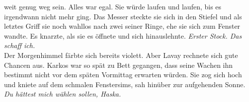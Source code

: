 weit genug weg sein. Alles war egal. Sie würde laufen und laufen, bis es irgendwann nicht mehr ging. 
Das Messer steckte sie sich in den Stiefel und als letztes Griff sie noch wahllos nach zwei seiner 
Ringe, ehe sie sich zum Fenster wandte. Es knarzte, als sie es öffnete und sich hinauslehnte. 
\textit{Erster Stock. Das schaff ich.}\\
Der Morgenhimmel färbte sich bereits violett. Aber Lavay rechnete sich gute Chancen aus. Karkos war 
so spät zu Bett gegangen, dass seine Wachen ihn bestimmt nicht vor dem späten Vormittag erwarten 
würden. Sie zog sich hoch und kniete auf dem schmalen Fenstersims, sah hinüber zur aufgehenden 
Sonne.\\
\textit{Du hättest mich wählen sollen, Haska.}\\


